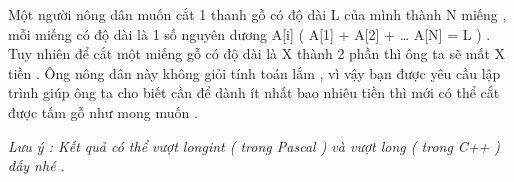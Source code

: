 Một người nông dân muốn cắt 1 thanh gỗ có độ dài L của mình thành N miếng , mỗi miếng có độ dài là 1 số nguyên dương A[i] ( A[1] + A[2] + … A[N] = L ) . Tuy nhiên để cắt một miếng gỗ có độ dài là X thành 2 phần thì ông ta sẽ mất X tiền . Ông nông dân này không giỏi tính toán lắm , vì vậy bạn được yêu cầu lập trình giúp ông ta cho biết cần để dành ít nhất bao nhiêu tiền thì mới có thể cắt được tấm gỗ như mong muốn .   





\textit{    Lưu ý : Kết quả có thể vượt         longint        ( trong Pascal ) và vượt         long        ( trong C++ ) đấy nhé .   }